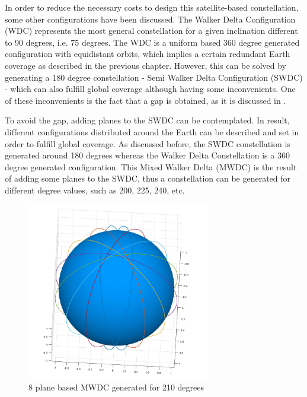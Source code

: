 In order to reduce the necessary costs to design this satellite-based constellation, some other configurations have been discussed. The Walker Delta Configuration (WDC) represents the most general constellation for a given inclination different to 90 degrees, i.e. 75 degrees. The WDC is a uniform based 360 degree generated configuration with equidistant orbits, which implies a certain redundant Earth coverage as described in the previous chapter. However, this can be solved by generating a 180 degree constellation - Semi Walker Delta Configuration (SWDC) - which can also fulfill global coverage although having some inconvenients. One of these inconvenients is the fact that a gap is obtained, as it is discussed in \cite[Chapter 3, Section 4]{annex1}.

To avoid the gap, adding planes to the SWDC can be contemplated. In result, different configurations distributed around the Earth can be described and set in order to fulfill global coverage. As discussed before, the SWDC constellation is generated around 180 degrees whereas the Walker Delta Constellation is a 360 degree generated configuration. This Mixed Walker Delta (MWDC) is the result of adding some planes to the SWDC, thus a constellation can be generated for different degree values, such as 200, 225, 240, etc. 

\begin{figure}[h]
\includegraphics[width=8cm]{MWDC}
\centering
\caption{8 plane based MWDC generated for 210 degrees}
\end{figure}